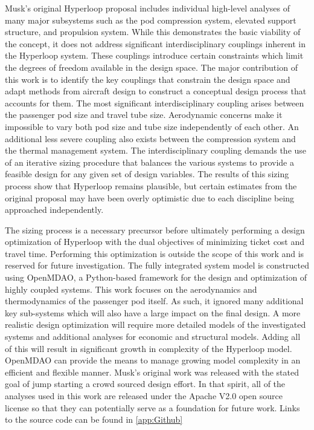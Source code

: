 \documentclass[heading.tex]{subfiles}
\begin{document}
Musk's original Hyperloop proposal includes individual high-level analyses of many major subsystems such as the pod compression system,
elevated support structure, and propulsion system. While this demonstrates the basic viability of the concept, it does not address
significant interdisciplinary couplings inherent in the Hyperloop system. These couplings introduce certain constraints which limit the 
degrees of freedom available in the design space. The major contribution of this work is to identify the key couplings that constrain the design space
and adapt methods from aircraft design to construct a conceptual design process that accounts for them. The most significant 
interdisciplinary coupling arises between the passenger pod size and travel tube size. Aerodynamic concerns make it impossible to vary 
both pod size and tube size independently of each other. An additional less severe coupling also exists between the compression system and 
the thermal management system. The interdisciplinary coupling demands the use of an iterative sizing procedure that balances 
the various systems to provide a feasible design for any given set of design variables. The results of this sizing process show that
Hyperloop remains plausible, but certain estimates from the original proposal may have been overly optimistic due to each discipline being approached independently. 

The sizing process is a necessary precursor before ultimately performing a design optimization of 
Hyperloop with the dual objectives of minimizing ticket cost and travel time. Performing this optimization 
is outside the scope of this work and is reserved for future investigation. 
The fully integrated system model is constructed using OpenMDAO, a Python-based framework for 
the design and optimization of highly coupled systems\cite{GrayBenchmarking2013}. 
This work focuses on the aerodynamics and thermodynamics of the passenger pod itself.
As such, it ignored many additional key sub-systems which will also have a large impact on the final design.
A more realistic design optimization will require more detailed models of the investigated systems and additional analyses for economic and 
structural models. Adding all of this will result in significant growth in complexity of the Hyperloop model. 
OpenMDAO can provide the means to manage growing model complexity 
in an efficient and flexible manner. Musk's original work was released with the stated goal of jump starting
a crowd sourced design effort. In that spirit, all of the analyses used in this work are released under
the Apache V2.0 open source license so that they can potentially serve as a foundation for future work. 
Links to the source code can be found in \cref{app:Github}
\end{document}
